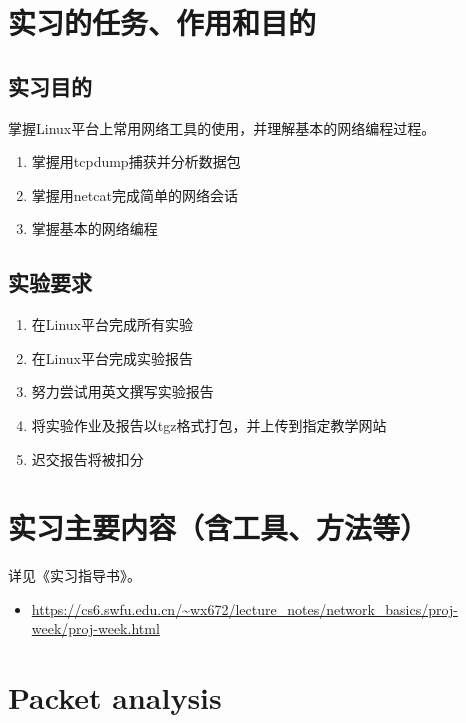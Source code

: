 \documentclass{swfulabreport}
\begin{document}
\maketitle %

\tableofcontents
\clearpage

\section{实习的任务、作用和目的}

\subsection{实习目的}

掌握Linux平台上常用网络工具的使用，并理解基本的网络编程过程。
\begin{enumerate}
\item 掌握用tcpdump捕获并分析数据包
\item 掌握用netcat完成简单的网络会话
\item 掌握基本的网络编程
\end{enumerate}

\subsection{实验要求}

\begin{enumerate}
\item 在Linux平台完成所有实验
\item 在Linux平台完成实验报告
\item 努力尝试用英文撰写实验报告
\item 将实验作业及报告以tgz格式打包，并上传到指定教学网站
\item 迟交报告将被扣分
\end{enumerate}

\section{实习主要内容（含工具、方法等）}

详见《实习指导书》。
\begin{itemize}
\item \url{https://cs6.swfu.edu.cn/~wx672/lecture_notes/network_basics/proj-week/proj-week.html}
\end{itemize}

\section{Packet analysis}
\end{document}
